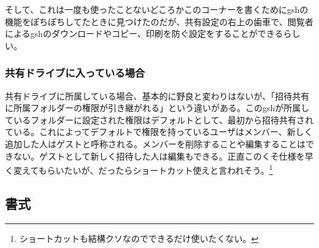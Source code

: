 \documentclass[dvipdfmx,jb5]{jreport}
\begin{document}
そして、これは一度も使ったことないどころかこのコーナーを書くためにgshの機能をぽちぽちしてたときに見つけたのだが、共有設定の右上の歯車で、閲覧者によるgshのダウンロードやコピー、印刷を防ぐ設定をすることができるらしい。
\subsubsection{共有ドライブに入っている場合}
共有ドライブに所属している場合、基本的に野良と変わりはないが、「招待共有に所属フォルダーの権限が引き継がれる」という違いがある。このgshが所属しているフォルダーに設定された権限はデフォルトとして、最初から招待共有されている。これによってデフォルトで権限を持っているユーザはメンバー、新しく追加した人はゲストと呼称される。メンバーを削除することや編集することはできない。ゲストとして新しく招待した人は編集もできる。正直このくそ仕様を早く変えてもらいたいが、だったらショートカット使えと言われそう。\footnote{ショートカットも結構クソなのでできるだけ使いたくない。}

\subsection{書式}
\end{document}
